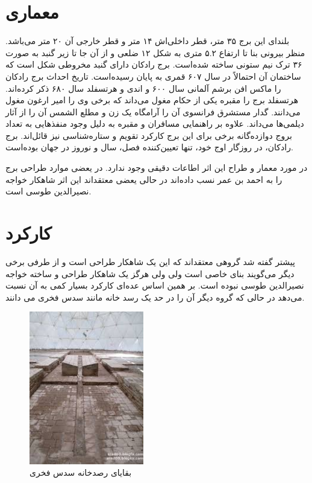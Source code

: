 \documentclass{article}
\begin{document}
\section{معماری}
بلندای این برج ۳۵ متر، قطر داخلی‌اش ۱۴ متر و قطر خارجی آن ۲۰ متر می‌باشد. منظر بیرونی بنا تا ارتفاع ۵.۲ متری به شکل ۱۲ ضلعی و از آن جا تا زیر گنبد به صورت ۳۶ ترک نیم ستونی ساخته شده‌است. برج رادکان دارای گنبد مخروطی شکل است که ساختمان آن احتمالاً در سال ۶۰۷ قمری به پایان رسیده‌است. تاریخ احداث برج رادکان را ماکس افن برشم آلمانی سال ۶۰۰ و اندی و هرتسفلد سال ۶۸۰ ذکر کرده‌اند. هرتسفلد برج را مقبره یکی از حکام مغول می‌داند که برخی وی را امیر ارغون مغول می‌دانند. گدار مستشرق فرانسوی آن را آرامگاه یک زن و مطلع الشمس آن را از آثار دیلمی‌ها می‌داند. علاوه بر راهنمایی مسافران و مقبره به دلیل وجود منفذهایی به تعداد بروج دوازده‌گانه برخی برای این برج کارکرد تقویم و ستاره‌شناسی نیز قائل‌اند. برج رادکان، در روزگار اوج خود، تنها تعیین‌کننده فصل، سال و نوروز در جهان بوده‌است.

در مورد معمار و طراح این اثر اطاعات دقیقی وجود ندارد. در یعضی موارد طراحی برج را به احمد بن عمر نسب داده‌اند در حالی 
یعضی معتقداند این اثر شاهکار  خواجه نصیرالدین طوسی است.
\section{کارکرد}
پیشتر گفته شد گروهی معتقداند که این یک شاهکار طراحی است و از طرفی برخی دیگر می‌گویند بنای خاصی است ولی ولی هرگز یک شاهکار طراحی و ساخته خواجه نصیرالدین طوسی نبوده است. بر همین اساس عده‌ای کارکرد بسیار کمی به آن نسبت می‌دهد در حالی که گروه دیگر آن را در حد یک رسد خانه مانند سدس فخری می 
دانند.
		\begin{figure}[h!]
			\includegraphics[width=50mm]{figures/sodos.jpeg}
			\centering
			\caption{بقایای رصدخانه سدس فخری}
			\label{sodos}
		\end{figure}
		\clearpage
	
\end{document}

